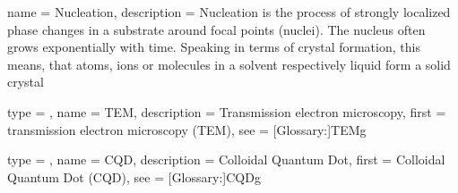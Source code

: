 	{
	name				= {Nucleation},
	description	= {Nucleation is the process of strongly localized phase changes in a substrate around focal points (nuclei).
								 The nucleus often grows exponentially with time.
								 Speaking in terms of crystal formation, this means, that atoms, ions or molecules in a solvent respectively liquid form
								 a solid crystal}
	}





	{
	type				= \acronymtype,
	name				= {TEM},
	description	= {Transmission electron microscopy},
	first				= {transmission electron microscopy (TEM)},
	see					=	[Glossary:]{TEMg}
	}
	
	{
	type				= \acronymtype,
	name				= {CQD},
	description	= {Colloidal Quantum Dot},
	first				= {Colloidal Quantum Dot (CQD)},
	see					=	[Glossary:]{CQDg}
	}